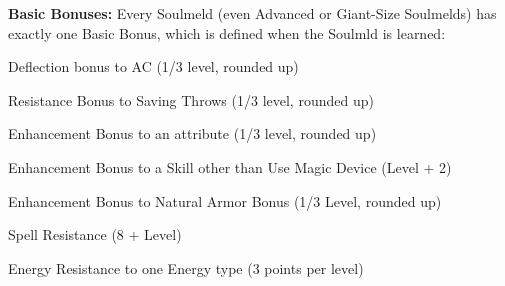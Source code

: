 \textbf{Basic Bonuses:} Every Soulmeld (even Advanced or Giant-Size Soulmelds) has exactly one Basic Bonus, which is defined when the Soulmld is learned:
\begin{itemize*}
\item Deflection bonus to AC (1/3 level, rounded up) 
\item Resistance Bonus to Saving Throws (1/3 level, rounded up) 
\item Enhancement Bonus to an attribute (1/3 level, rounded up) 
\item Enhancement Bonus to a Skill other than Use Magic Device (Level + 2) 
\item Enhancement Bonus to Natural Armor Bonus (1/3 Level, rounded up) 
\item Spell Resistance (8 + Level) 
\item Energy Resistance to one Energy type (3 points per level)
\end{itemize*}



